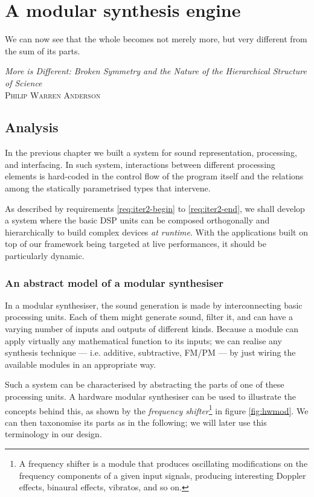 
\chapter{A modular synthesis engine}
\label{sec:04-graph}

\epigraph{We can now see that the whole becomes not merely more, but
  very different from the sum of its parts.}{\emph{More is Different:
  Broken Symmetry and the Nature of the Hierarchical Structure of
  Science}\\\textsc{Philip Warren Anderson}}

\section{Analysis}

In the previous chapter we built a system for sound representation,
processing, and interfacing. In such system, interactions
between different processing elements is hard-coded in the control
flow of the program itself and the relations among the statically
parametrised types that intervene.

As described by requirements \ref{req:iter2-begin} to
\ref{req:iter2-end}, we shall develop a system where the basic DSP
units can be composed orthogonally and hierarchically to build complex
devices \emph{at runtime}. With the applications built on top of our
framework being targeted at live performances, it should be
particularly dynamic.

\subsection{An abstract model of a modular synthesiser}

In a modular synthesiser, the sound
generation is made by interconnecting basic processing units. Each of
them might generate sound, filter it, and can have a varying number of
inputs and outputs of different kinds. Because a 
module can apply virtually any mathematical function to its inputs; we
can realise any synthesis technique --- i.e. additive, subtractive,
FM/PM --- by just wiring the available modules in an appropriate way.

Such a system can be characterised by abstracting the parts of one of
these processing units. A hardware modular
synthesiser can be used to illustrate the concepts behind this, as
shown by the \emph{frequency shifter}\footnote{A frequency shifter is
  a module that produces oscillating modifications on the frequency
  components of a given input signals, producing interesting Doppler
  effects, binaural effects, vibratos, and so on.} in figure
\ref{fig:hwmod}. We can then taxonomise its parts as in the following;
we will later use this terminology in our design.

